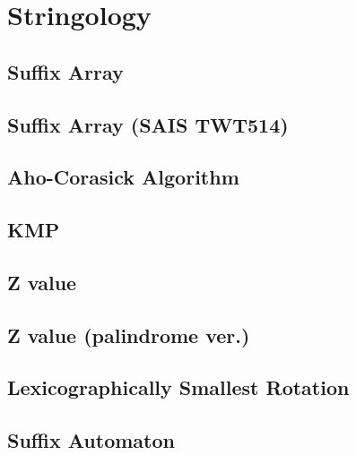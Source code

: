 \documentclass[a4paper,10pt,twocolumn,oneside]{article}
\begin{document}
\section{Stringology}
\subsection{Suffix Array}


\subsection{Suffix Array (SAIS TWT514)}


\subsection{Aho-Corasick Algorithm}


\subsection{KMP}


\subsection{Z value}


\subsection{Z value (palindrome ver.)}


%

\subsection{Lexicographically Smallest Rotation}


\subsection{Suffix Automaton}

\end{document}

